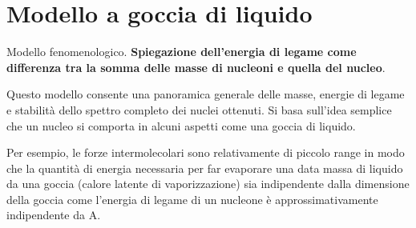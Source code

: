 \documentclass[a4paper,11pt,twoside,openany]{book}
\theoremstyle{definition}
\theoremstyle{plain}
\theoremstyle{plain}
\theoremstyle{definition}
\begin{document}
\section{Modello a goccia di liquido} %
Modello fenomenologico. \textbf{Spiegazione dell'energia di legame come differenza tra la somma delle masse di nucleoni e quella del nucleo}. 

Questo modello consente una panoramica generale delle masse, energie di legame e stabilità dello spettro completo dei nuclei ottenuti. Si basa sull'idea semplice che un nucleo si comporta in alcuni aspetti come una goccia di liquido.

Per esempio, le forze intermolecolari sono relativamente di piccolo range in modo che la quantità di energia necessaria per far evaporare una data massa di liquido da una goccia (calore latente di vaporizzazione) sia indipendente dalla dimensione della goccia come l'energia di legame di un nucleone è approssimativamente indipendente da A.
\end{document}
